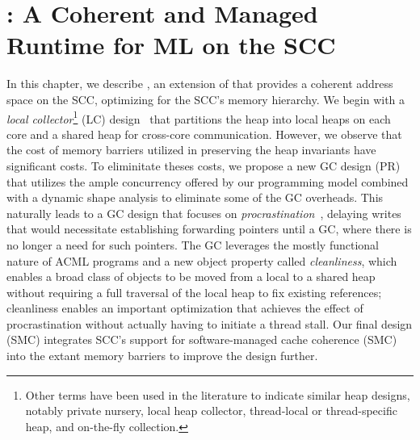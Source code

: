 \newcommand{\lc}{LC\xspace}
\newcommand{\prc}{PR\xspace}
\newcommand{\smc}{SMC\xspace}
\newcommand{\kcore}{k_{core}}
\newcommand{\kmesh}{k_{mesh}}
\newcommand{\kram}{k_{ram}}

\lstset{
language=C,
numbers=left,
numberstyle=\footnotesize,
frame=single}




\chapter{\MMSCC: A Coherent and Managed Runtime for ML on the SCC}
\label{chap:aneris}

In this chapter, we describe \MMSCC, an extension of \MM that provides a
coherent address space on the SCC, optimizing for the SCC's memory hierarchy.
We begin with a \emph{local collector}\footnote{Other terms have been used in
the literature to indicate similar heap designs, notably private nursery, local
heap collector, thread-local or thread-specific heap, and on-the-fly
collection.} (\lc)
design~\cite{Steele75,Doligez93,Steensgaard00,Anderson10,Marlow11,Auhagen11}
that partitions the heap into local heaps on each core and a shared heap for
cross-core communication. However, we observe that the cost of memory barriers
utilized in preserving the heap invariants have significant costs. To
eliminitate theses costs, we propose a new GC design (\prc) that utilizes the
ample concurrency offered by our programming model combined with a dynamic
shape analysis to eliminate some of the GC overheads. This naturally leads to a
GC design that focuses on \emph{procrastination}~\cite{mmgc}, delaying writes
that would necessitate establishing forwarding pointers until a GC, where there
is no longer a need for such pointers. The GC leverages the mostly functional
nature of ACML programs and a new object property called \emph{cleanliness},
which enables a broad class of objects to be moved from a local to a shared
heap without requiring a full traversal of the local heap to fix existing
references; cleanliness enables an important optimization that achieves the
effect of procrastination without actually having to initiate a thread stall.
Our final design (\smc) integrates SCC's support for software-managed cache
coherence (SMC)~\cite{SMC} into the extant memory barriers to improve the
design further.

